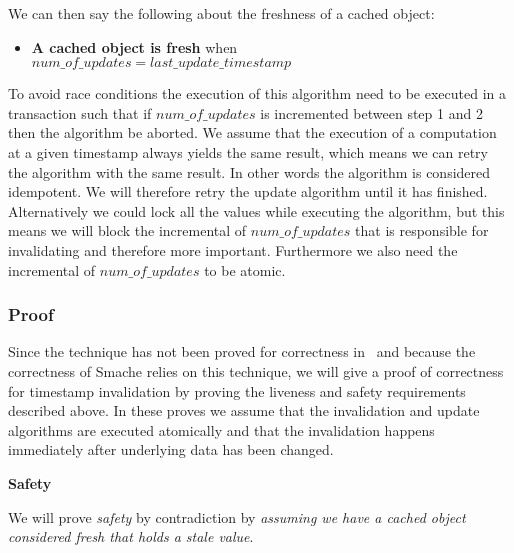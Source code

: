 We can then say the following about the freshness of a cached object:

\begin{itemize}
  \item \textbf{A cached object is fresh} when\\$num\_of\_updates = last\_update\_timestamp$
\end{itemize}

To avoid race conditions the execution of this algorithm need to be executed in a transaction such that if $num\_of\_updates$ is incremented between step 1 and 2 then the algorithm be aborted. We assume that the execution of a computation at a given timestamp always yields the same result, which means we can retry the algorithm with the same result. In other words the algorithm is considered idempotent. We will therefore retry the update algorithm until it has finished. Alternatively we could lock all the values while executing the algorithm, but this means we will block the incremental of $num\_of\_updates$ that is responsible for invalidating and therefore more important.
Furthermore we also need the incremental of $num\_of\_updates$ to be atomic.

\subsubsection{Proof}
\label{subsubsec:proof}

Since the technique has not been proved for correctness in~\cite{paper:ibm-extended} and because the correctness of Smache relies on this technique, we will give a proof of correctness for timestamp invalidation by proving the liveness and safety requirements described above. In these proves we assume that the invalidation and update algorithms are executed atomically and that the invalidation happens immediately after underlying data has been changed.

\textbf{Safety}

We will prove \emph{safety} by contradiction by \emph{assuming we have a cached object considered fresh that holds a stale value}.

